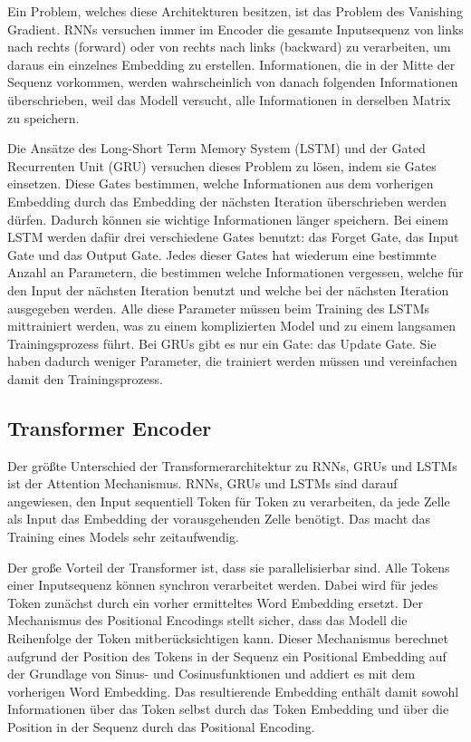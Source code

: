 Ein Problem, welches diese Architekturen besitzen, ist das Problem des Vanishing Gradient.
RNNs versuchen immer im Encoder die gesamte Inputsequenz von links nach rechts (forward) oder von rechts nach links (backward) zu verarbeiten, um daraus ein einzelnes Embedding zu erstellen.
Informationen, die in der Mitte der Sequenz vorkommen, werden wahrscheinlich von danach folgenden Informationen überschrieben, weil das Modell versucht, alle Informationen in derselben Matrix zu speichern. 

Die Ansätze des Long-Short Term Memory System (LSTM) und der Gated Recurrenten Unit (GRU) versuchen dieses Problem zu lösen, indem sie Gates einsetzen.
Diese Gates bestimmen, welche Informationen aus dem vorherigen Embedding durch das Embedding der nächsten Iteration überschrieben werden dürfen.
Dadurch können sie wichtige Informationen länger speichern.
Bei einem LSTM werden dafür drei verschiedene Gates benutzt: das Forget Gate, das Input Gate und das Output Gate.
Jedes dieser Gates hat wiederum eine bestimmte Anzahl an Parametern, die bestimmen welche Informationen vergessen, welche für den Input der nächsten Iteration benutzt und welche bei der nächsten Iteration ausgegeben werden.
Alle diese Parameter müssen beim Training des LSTMs mittrainiert werden, was zu einem komplizierten Model und zu einem langsamen Trainingsprozess führt.
Bei GRUs gibt es nur ein Gate: das Update Gate.
Sie haben dadurch weniger Parameter, die trainiert werden müssen und vereinfachen damit den Trainingsprozess.
\cite{pirani2022}

\subsection{Transformer Encoder}

Der größte Unterschied der Transformerarchitektur zu RNNs, GRUs und LSTMs ist der Attention Mechanismus.
RNNs, GRUs und LSTMs sind darauf angewiesen, den Input sequentiell Token für Token zu verarbeiten, da jede Zelle als Input das Embedding der vorausgehenden Zelle benötigt.
Das macht das Training eines Models sehr zeitaufwendig.

Der große Vorteil der Transformer ist, dass sie parallelisierbar sind.
Alle Tokens einer Inputsequenz können synchron verarbeitet werden. 
Dabei wird für jedes Token zunächst durch ein vorher ermitteltes Word Embedding ersetzt.
Der Mechanismus des Positional Encodings stellt sicher, dass das Modell die Reihenfolge der Token mitberücksichtigen kann.
Dieser Mechanismus berechnet aufgrund der Position des Tokens in der Sequenz ein Positional Embedding auf der Grundlage von Sinus- und Cosinusfunktionen und addiert es mit dem vorherigen Word Embedding.
Das resultierende Embedding enthält damit sowohl Informationen über das Token selbst durch das Token Embedding und über die Position in der Sequenz durch das Positional Encoding.


